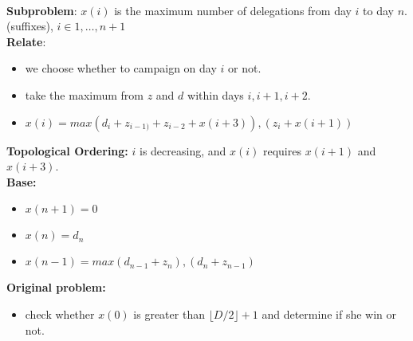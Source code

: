 \documentclass[12pt,twoside]{article}
\begin{document}


\begin{problems}

\problem  %
\\
  \textbf{Subproblem}: $x(i)$ is the maximum number of delegations from day $i$ to day $n$. (suffixes), $i \in {1, \dots , n + 1}$ \\
  \textbf{Relate}: 
  \begin{itemize}
    \item we choose whether to campaign on day $i$ or not.
    \item take the maximum from $z$ and $d$ within days $i, i+1, i+2$. 
    \item $x(i) = max{(d_i + z_{i-1)} + z_{i-2} + x(i + 3)), (z_i + x(i + 1))}$  
  \end{itemize}
  \textbf{Topological Ordering:} $i$ is decreasing, and $x(i)$ requires $x(i+1)$ and $x(i+3)$. \\
  \textbf{Base:} 
  \begin{itemize}
    \item $x(n+1) = 0$
    \item $x(n) = d_n$
    \item $x(n-1) = max{(d_{n-1} + z_n), (d_n + z_{n-1})}$
  \end{itemize}
  \textbf{Original problem:}
  \begin{itemize}
    \item check whether $x(0)$ is greater than $\lfloor D / 2 \rfloor + 1$ and determine if she win or not.
  \end{itemize}


\end{problems}
\end{document}
